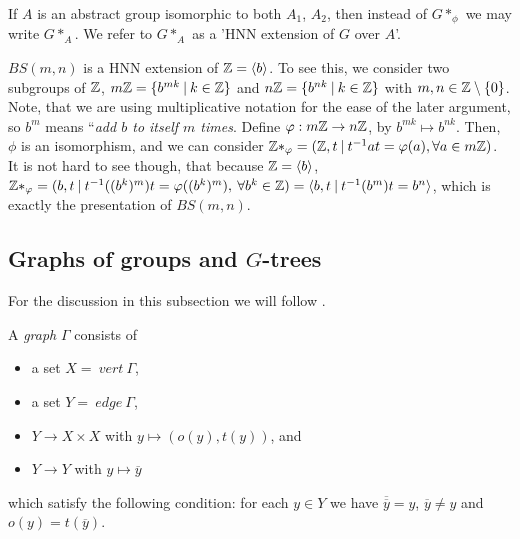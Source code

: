 \begin{remark}
    If $A$ is an abstract group isomorphic to both $A_1$, $A_2$, then instead of $G \ast _\phi$ we may write $G \ast _A$. We refer to $G \ast _A$ as a 'HNN extension of $G$ over $A$'.
\end{remark}

\begin{example}\label{BS as HNN}
    $BS(m,n)$ is a HNN extension of $\mathbb{Z}  =\langle b \rangle$. To see this, we consider two subgroups of $\mathbb{Z}$, $m\mathbb{Z} = \{b^{mk}\: | \: k \in \mathbb{Z}\}$ and $n\mathbb{Z} = \{b^{nk}\: | \: k \in \mathbb{Z}\}$ with $m,n \in \mathbb{Z} \setminus \{0\}$. Note, that we are using multiplicative notation for the ease of the later argument, so $b^m$ means ``\emph{add $b$ to itself $m$ times}. Define $\varphi: m\mathbb{Z} \to n\mathbb{Z}$, by $b^{mk} \mapsto b^{nk}$. Then, $\phi$ is an isomorphism, and we can consider $\mathbb{Z}\ast_\varphi = (\mathbb{Z},t \: | \: t^{-1}at = \varphi(a), \forall a\in m\mathbb{Z})$. It is not hard to see though, that because $\mathbb{Z} = \langle b \rangle$, $\mathbb{Z}\ast_\varphi = ( b,t \: | \: t^{-1}((b^k)^m)t = \varphi((b^k)^m), \: \forall b^k\in \mathbb{Z} ) = \langle b,t \: | \: t^{-1}(b^m)t = b^n\rangle $, which is exactly the presentation of $BS(m,n)$.
\end{example}


\subsection{Graphs of groups and $G$-trees}

For the discussion in this subsection we will follow \cite[chapter I]{Ser80}.

\begin{definition}
    A \emph{graph} $\Gamma$ consists of 
    \begin{itemize}
        \item a set $X = \:vert\:\Gamma$,
        \item a set $Y = \:edge\:\Gamma$,
        \item $Y \to  X \times X$ with $ y \mapsto (o(y), t(y))$, and 
        \item $Y \to Y$ with $y \mapsto \overline{y}$
    \end{itemize}
     which satisfy the following condition: for each $y \in Y$ we have $\overline{\overline{y}} = y$, $\overline{y} \neq y$ and $o(y) = t(\overline{y})$.
\end{definition}

